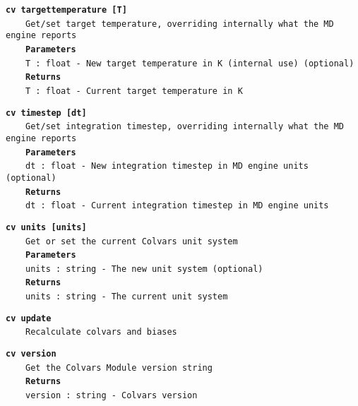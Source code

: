 \begin{mdexampleinput}{}
\texttt{\textbf{cv targettemperature [T]}}
\\
\-~~~~\texttt{Get/set target temperature, overriding internally what the MD engine reports}
\\
\-~~~~\texttt{\textbf{Parameters}}
\\
\-~~~~\texttt{T : float - New target temperature in K (internal use) (optional)}
\\
\-~~~~\texttt{\textbf{Returns}}
\\
\-~~~~\texttt{T : float - Current target temperature in K}
\end{mdexampleinput}
\begin{mdexampleinput}{}
\texttt{\textbf{cv timestep [dt]}}
\\
\-~~~~\texttt{Get/set integration timestep, overriding internally what the MD engine reports}
\\
\-~~~~\texttt{\textbf{Parameters}}
\\
\-~~~~\texttt{dt : float - New integration timestep in MD engine units (optional)}
\\
\-~~~~\texttt{\textbf{Returns}}
\\
\-~~~~\texttt{dt : float - Current integration timestep in MD engine units}
\end{mdexampleinput}
\begin{mdexampleinput}{}
\texttt{\textbf{cv units [units]}}
\\
\-~~~~\texttt{Get or set the current Colvars unit system}
\\
\-~~~~\texttt{\textbf{Parameters}}
\\
\-~~~~\texttt{units : string - The new unit system (optional)}
\\
\-~~~~\texttt{\textbf{Returns}}
\\
\-~~~~\texttt{units : string - The current unit system}
\end{mdexampleinput}
\begin{mdexampleinput}{}
\texttt{\textbf{cv update}}
\\
\-~~~~\texttt{Recalculate colvars and biases}
\end{mdexampleinput}
\begin{mdexampleinput}{}
\texttt{\textbf{cv version}}
\\
\-~~~~\texttt{Get the Colvars Module version string}
\\
\-~~~~\texttt{\textbf{Returns}}
\\
\-~~~~\texttt{version : string - Colvars version}
\end{mdexampleinput}
